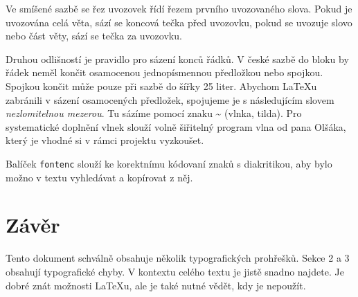 \documentclass[10pt]{article}[25.2.2024]
\begin{document}
\begin{multicols}{2}
Ve smíšené sazbě se řez uvozovek řídí řezem prvního uvozovaného slova.
Pokud je uvozována celá věta, sází se koncová tečka před uvozovku, pokud se uvozuje slovo nebo část věty, sází se tečka za uvozovku.

Druhou odlišností je pravidlo pro sázení konců řádků.
V české sazbě do bloku by řádek neměl končit osamocenou jednopísmennou předložkou nebo spojkou.
Spojkou  končit může pouze při sazbě do šířky 25 liter.
Abychom \LaTeX u zabránili v sázení osamocených předložek, spojujeme je s následujícím slovem \textit{nezlomitelnou mezerou}.
Tu sázíme pomocí znaku \~{ } (vlnka, tilda).
Pro systematické doplnění vlnek slouží volně šiřitelný program vlna od pana Olšáka\footnotemark[2], který je vhodné si v rámci projektu vyzkoušet.

Balíček \texttt{fontenc} slouží ke korektnímu kódovaní znaků s diakritikou, aby bylo možno v textu vyhledávat a kopírovat z něj.


\section{Závěr}
Tento dokument schválně obsahuje několik typografických prohřešků.
Sekce 2 a 3 obsahují typografické chyby.
V kontextu celého textu je jistě snadno najdete.
Je dobré znát možnosti \LaTeX u, ale je také nutné vědět, kdy je nepoužít.
\begin{minipage}{\columnwidth}
\end{minipage}


\end{multicols}
\end{document}
